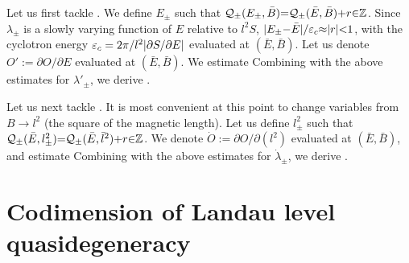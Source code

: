 \documentclass[aps, showpacs, twocolumn, notitlepage, superscriptaddress]{revtex4-1}
\begin{document}
Let us first tackle . We define $E_{\pm}$ such that ${\cal Q}_{\pm}(E_{\pm},\bar{B}){=}{\cal Q}_{\pm}(\bar{E},\bar{B}){+}r{\in} \mathbb{Z}$. Since  $\lambda_{\pm}$ is a slowly varying function of $E$ relative to $l^2S$, $|E_{\pm}{-}\bar{E}|/\varepsilon_c{\approx} |r|{<}1$, with the cyclotron energy $\varepsilon_c=2\pi/l^2|\partial S/\partial E|$ evaluated at $(\bar{E},\bar{B})$. Let us denote $O':=\partial O/\partial E$ evaluated at $(\bar{E},\bar{B})$. We estimate
Combining  with the above estimates for $\lambda'_{\pm}$, we derive .  

Let us next tackle . It is most convenient at this point to change variables from $B\rightarrow l^2$ (the square of the magnetic length). Let us  define   $l^2_{\pm}$ such that ${\cal Q}_{\pm}(\bar{E},l^2_{\pm}){=}{\cal Q}_{\pm}(\bar{E},\bar{l}^2){+}r{\in} \mathbb{Z}$. We denote  $\dot{O}:=\partial O/\partial(l^2)$ evaluated at $(\bar{E},\bar{B})$, and estimate
Combining  with the above estimates for $\dot{\lambda}_{\pm}$, we derive .

\section{Codimension of Landau level quasidegeneracy}\label{app:codimension}
\end{document}
